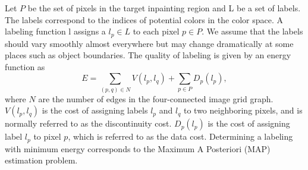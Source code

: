 \documentclass[runningheads]{llncs}
\begin{document}
Let $P$ be the set of pixels in the target inpainting region and L be a set of labels. The labels correspond to the indices of potential colors in the color space. A labeling function l assigns a $l_p \in L$ to each pixel $p \in P$. We assume that the labels should vary smoothly almost everywhere but may change dramatically at some places such as object boundaries. The quality of labeling is given by an energy function as 
\begin{equation}
E = \sum_{(p, q) \in N}V(l_p, l_q) + \sum_{p \in P}D_p(l_p),
\end{equation} 
where $N$ are the number of edges in the four-connected image grid graph. $V(l_p, l_q)$ is the cost of assigning labels $l_p$ and $l_q$ to two neighboring pixels, and is normally referred to as the discontinuity cost. $D_p(l_p)$ is the cost of assigning label $l_p$ to pixel $p$,  which is referred to as the data cost. Determining a labeling with minimum energy corresponds to the Maximum A Posteriori (MAP) estimation problem.
\end{document}
